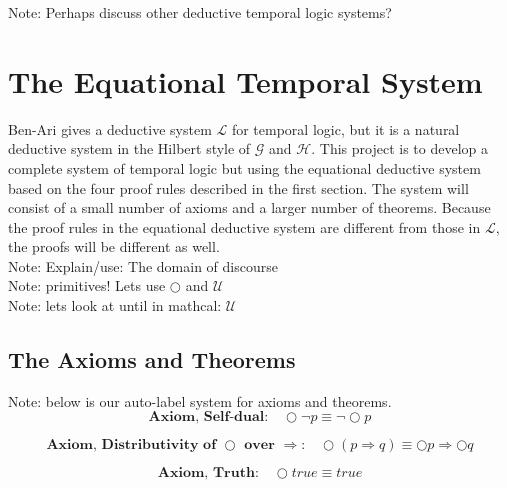 \documentclass[fleqn, leqno]{article}
\begin{document}
Note: Perhaps discuss other deductive temporal logic systems?\\

\section{The Equational Temporal System}

Ben-Ari \cite{Ben} gives a deductive system $\mathcal{L}$ for temporal logic, but it is a
natural deductive system in the Hilbert style of $\mathcal{G}$ and $\mathcal{H}$. This project is to develop a complete system of
temporal logic but using the equational deductive system based on the four proof rules described
in the first section. The system will consist of a small number of axioms and a larger number of
theorems. Because the proof rules in the equational deductive system are different from those
in $\mathcal{L}$, the proofs will be different as well.\\

Note: Explain/use: The domain of discourse\\

Note: primitives!  Lets use $\bigcirc$ and $\mathcal{U}$\\

Note: lets look at until in mathcal: $\mathcal{U}$\\



\subsection{The Axioms and Theorems}

Note: below is our auto-label system for axioms and theorems.\\

\begin{equation}\label{E:selfDual}
\textbf{Axiom, Self-dual:}\quad \bigcirc\lnot p \equiv \lnot\bigcirc p
\end{equation}

\begin{equation}\label{E:distNextImp}
\textbf{Axiom, Distributivity of $\bigcirc$ over $\Rightarrow$:}\quad \bigcirc (p \Rightarrow q) \equiv \bigcirc p \Rightarrow \bigcirc q
\end{equation}

\begin{equation}\label{E:nextTruth}
\textbf{Axiom, Truth:}\quad \bigcirc true \equiv true
\end{equation}
\end{document}

